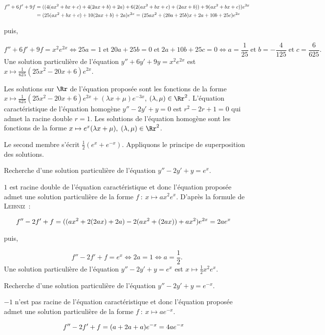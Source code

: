 {{\begin{align*}\ensuremath
f''+6f'+9f&=((4(ax^2+bx+c)+4(2ax+b)+2a)+6(2(ax^2+bx+c)+(2ax+b))+9(ax^2+bx+c))e^{2x}\\
 &=(25(ax^2+bx+c)+10(2ax+b)+2a)e^{2x}=(25ax^2+(20a+25b)x+2a+10b+25c)e^{2x}
\end{align*}

puis,

$$f''+6f'+9f=x^2e^{2x}\Leftrightarrow25a=1\;\mbox{et}\;20a+25b=0\;\mbox{et}\;2a+10b+25c=0\Leftrightarrow
a=\frac{1}{25}\;\mbox{et}\;b=-\frac{4}{125}\;\mbox{et}\;c=\frac{6}{625}.$$
Une solution particulière de l'équation $y''+6y'+9y=x^2e^{2x}$ est $x\mapsto\frac{1}{625}(25x^2-20x+6)e^{2x}$.

Les solutions sur $\Rr$ de l'équation proposée sont les fonctions de la forme
$x\mapsto\frac{1}{625}(25x^2-20x+6)e^{2x}+(\lambda x+\mu)e^{-3x}$, $(\lambda,\mu)\in\Rr^2$.
L'équation caractéristique de l'équation homogène $y''-2y'+y=0$ est $r^2-2r+1=0$ qui admet la racine double
$r=1$. Les solutions de l'équation homogène sont les fonctions de la forme $x\mapsto
e^{x}(\lambda x+\mu),\;(\lambda,\mu)\in\Rr^2$.

Le second membre s'écrit $\frac{1}{2}(e^{x}+e^{-x})$. Appliquons le principe de superposition des solutions.

Recherche d'une solution particulière de l'équation $y''-2y'+y=e^{x}$.

$1$ est racine double de l'équation caractéristique et donc
l'équation proposée admet une solution particulière de la forme $f~:~x\mapsto ax^2e^{x}$. D'après la formule
de \textsc{Leibniz}~:

\begin{align*}\ensuremath
f''-2f'+f&=((ax^2+2(2ax)+2a)-2(ax^2+(2ax))+ax^2)e^{2x}=2ae^{x}
\end{align*}

puis,

$$f''-2f'+f=e^{x}\Leftrightarrow2a=1\Leftrightarrow a=\frac{1}{2}.$$
Une solution particulière de l'équation $y''-2y'+y=e^{x}$ est $x\mapsto\frac{1}{2}x^2e^{x}$.

Recherche d'une solution particulière de l'équation $y''-2y'+y=e^{-x}$.

$-1$ n'est pas racine de l'équation caractéristique et donc
l'équation proposée admet une solution particulière de la forme $f~:~x\mapsto ae^{-x}$.

\begin{align*}\ensuremath
f''-2f'+f&=(a+2a+a)e^{-x}=4ae^{-x}
\end{align*}

}}
